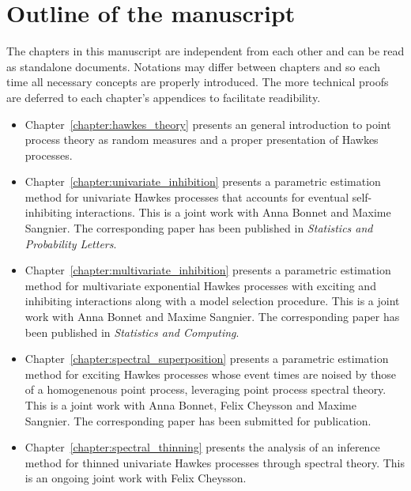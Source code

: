     \section*{Outline of the manuscript} The chapters in this manuscript are independent from each other and can 
    be read as standalone documents.
    Notations may differ between chapters and so each time all necessary concepts are properly introduced.
    The more technical proofs are deferred to each chapter's appendices to facilitate readibility.
    \begin{itemize}
        \item Chapter~\ref{chapter:hawkes_theory} presents an general introduction to point process theory as random measures and a proper presentation of Hawkes processes.
        \item Chapter~\ref{chapter:univariate_inhibition} presents a parametric estimation method for univariate Hawkes processes that accounts for eventual self-inhibiting interactions. This is a joint work with Anna Bonnet and Maxime Sangnier. The corresponding paper has been published in \textit{Statistics and Probability Letters}.
        \item Chapter~\ref{chapter:multivariate_inhibition} presents a parametric estimation method for multivariate exponential Hawkes processes with exciting and inhibiting interactions along with a model selection procedure. This is a joint work with Anna Bonnet and Maxime Sangnier. The corresponding paper has been published in \textit{Statistics and Computing}.
        \item Chapter~\ref{chapter:spectral_superposition} presents a parametric estimation method for exciting Hawkes processes whose event times are noised by those of a homogenenous point process, leveraging point process spectral theory. This is a joint work with Anna Bonnet, Felix Cheysson and Maxime Sangnier. The corresponding paper has been submitted for publication.
        \item Chapter~\ref{chapter:spectral_thinning} presents the analysis of an inference method for thinned univariate Hawkes processes through spectral theory. This is an ongoing joint work with Felix Cheysson.
    \end{itemize}



